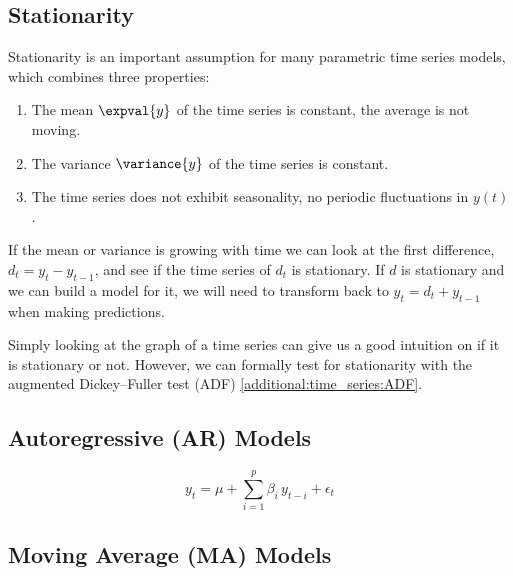 \subsection{Stationarity}
\label{additional:time_series:stationarity}

Stationarity is an important assumption for many parametric time series models,
which combines three properties:

\begin{enumerate}[noitemsep]
\item The mean $\expval{y}$ of the time series is constant, \ie the average is not moving.\label{item:time_series:stationarity:constant_mean}
\item The variance $\variance{y}$ of the time series is constant.\label{item:time_series:stationarity:constant_var}
\item The time series does not exhibit seasonality, \ie no periodic fluctuations in $y\left(t\right)$.
\label{item:time_series:stationarity:seasonality}
\end{enumerate}

If the mean or variance is growing with time
we can look at the first difference, $d_{t} = y_{t} -y_{t-1}$,
and see if the time series of $d_{t}$ is stationary.
If $d$ is stationary and we can build a model for it, we will
need to transform back to $y_{t} = d_{t} + y_{t-1}$ when making predictions.

Simply looking at the graph of a time series can give us
a good intuition on if it is stationary or not.
However, we can formally test for stationarity
with the augmented Dickey--Fuller test (ADF) \cref{additional:time_series:ADF}.

\subsection{Autoregressive (AR) Models}
\label{additional:time_series:AR}

\begin{equation}\label{eq:time_series:AR}
y_{t} = \mu + \sum_{i=1}^{p} \beta_{i}\, y_{t-i} + \epsilon_{t}
\end{equation}


\subsection{Moving Average (MA) Models}
\label{additional:time_series:MA}

